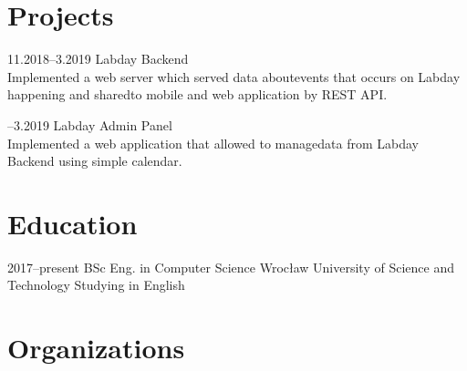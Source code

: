 \documentclass[]{cv-style}
\begin{document}
\section{Projects}

\begin{entrylist}
\entry
  {11.2018--3.2019}
  { Labday Backend}
  {}
  {\\
  Implemented a web server which served data about\newline events that occurs on Labday happening and shared\newline to mobile and web application by REST API.}

\entry
  {\newline{}--3.2019  }
  { Labday Admin Panel}
  {}
  {\\
  Implemented a web application that allowed to manage\newline data from Labday Backend using simple calendar.}
  {\vspace{-0.3cm}}
\end{entrylist}


\section{Education}

\begin{entrylist}
\entry
{2017--present\quad }
{ BSc Eng. {\normalfont  in Computer Science}}
{Wrocław University of Science and Technology}
{ Studying in English}
{\vspace{0.3cm}}
\end{entrylist}


\section{Organizations}
\end{document}
